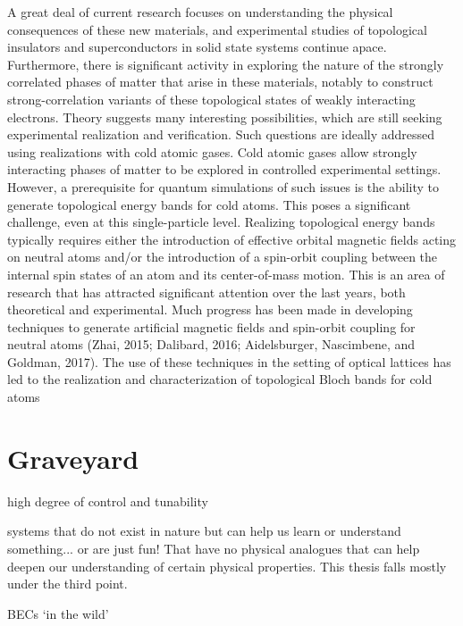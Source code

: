 A great deal of current research focuses on understanding
the physical consequences of these new materials, and
experimental studies of topological insulators and superconductors in solid state systems continue apace. Furthermore,
there is significant activity in exploring the nature of the
strongly correlated phases of matter that arise in these
materials, notably to construct strong-correlation variants of
these topological states of weakly interacting electrons.
Theory suggests many interesting possibilities, which are still
seeking experimental realization and verification.
Such questions are ideally addressed using realizations with
cold atomic gases. Cold atomic gases allow strongly interacting phases of matter to be explored in controlled experimental
settings. However, a prerequisite for quantum simulations of
such issues is the ability to generate topological energy bands
for cold atoms. This poses a significant challenge, even at this
single-particle level. Realizing topological energy bands
typically requires either the introduction of effective orbital
magnetic fields acting on neutral atoms and/or the introduction of a spin-orbit coupling between the internal spin states of
an atom and its center-of-mass motion. This is an area of
research that has attracted significant attention over the last
years, both theoretical and experimental. Much progress has
been made in developing techniques to generate artificial
magnetic fields and spin-orbit coupling for neutral atoms
(Zhai, 2015; Dalibard, 2016; Aidelsburger, Nascimbene, and
Goldman, 2017). The use of these techniques in the setting of
optical lattices has led to the realization and characterization
of topological Bloch bands for cold atoms

\section{Graveyard}
high degree of control and tunability 







systems that do not exist in nature but can help us learn or understand something... or are just fun!
That have no physical analogues that can help deepen our understanding of certain physical properties. This thesis falls mostly under the third point. 



 BECs `in the wild' 




